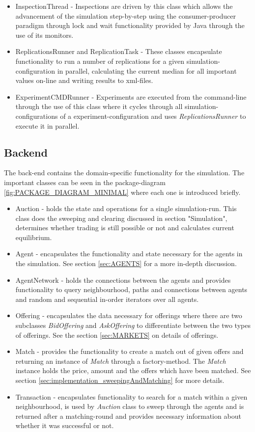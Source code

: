 \documentclass[Bachelorarbeit.tex]{subfiles}
\begin{document}
\begin{itemize}
\item InspectionThread - Inspections are driven by this class which allows the advancement of the simulation step-by-step using the consumer-producer paradigm through lock and wait functionality provided by Java through the use of its monitors.
\item ReplicationsRunner and ReplicationTask - These classes encapsulate functionality to run a number of replications for a given simulation-configuration in parallel, calculating the current median for all important values on-line and writing results to xml-files.
\item ExperimentCMDRunner - Experiments are executed from the command-line through the use of this class where it cycles through all simulation-configurations of a experiment-configuration and uses \textit{ReplicationsRunner} to execute it in parallel. 
\end{itemize}

\subsection{Backend}
The back-end contains the domain-specific functionality for the simulation. The important classes can be seen in the package-diagram \ref{fig:PACKAGE_DIAGRAM_MINIMAL} where each one is introduced briefly.

\begin{itemize}
\item Auction - holds the state and operations for a single simulation-run. This class does the sweeping and clearing discussed in section "Simulation", determines whether trading is still possible or not and calculates current equilibrium.
\item Agent - encapsulates the functionality and state necessary for the agents in the simulation. See section \ref{sec:AGENTS} for a more in-depth discussion.
\item AgentNetwork - holds the connections between the agents and provides functionality to query neighbourhood, paths and connections between agents and random and sequential in-order iterators over all agents.
\item Offering - encapsulates the data necessary for offerings where there are two subclasses \textit{BidOffering} and \textit{AskOffering} to differentiate between the two types of offerings. See the section \ref{sec:MARKETS} on details of offerings.
\item Match - provides the functionality to create a match out of given offers and returning an instance of \textit{Match} through a factory-method. The \textit{Match} instance holds the price, amount and the offers which have been matched. See section \ref{sec:implementation_sweepingAndMatching} for more details.
\item Transaction - encapsulates functionality to search for a match within a given neighbourhood, is used by \textit{Auction} class to sweep through the agents and is returned after a matching-round and provides necessary information about whether it was successful or not.
\end{itemize}
\end{document}
